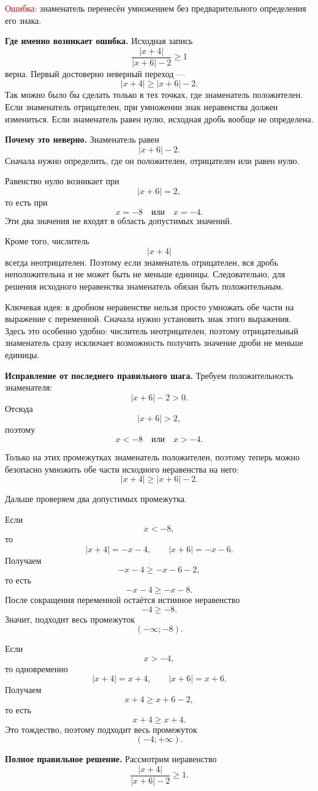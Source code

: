 \documentclass[12pt,a4paper]{article}
\newcommand{\err}{\textcolor{red}{Ошибка:}}
\newcommand{\idea}{\textcolor{blue!60!black}{Ключевая идея:}}
\begin{document}
\err{} знаменатель перенесён умножением без предварительного определения его знака.

\textbf{Где именно возникает ошибка.}
Исходная запись
\[
\frac{|x+4|}{|x+6|-2}\ge 1
\]
верна. Первый достоверно неверный переход ---
\[
|x+4|\ge |x+6|-2.
\]
Так можно было бы сделать только в тех точках, где знаменатель положителен. Если знаменатель отрицателен, при умножении знак неравенства должен измениться. Если знаменатель равен нулю, исходная дробь вообще не определена.

\textbf{Почему это неверно.}
Знаменатель равен
\[
|x+6|-2.
\]
Сначала нужно определить, где он положителен, отрицателен или равен нулю.

Равенство нулю возникает при
\[
|x+6|=2,
\]
то есть при
\[
x=-8\quad\text{или}\quad x=-4.
\]
Эти два значения не входят в область допустимых значений.

Кроме того, числитель
\[
|x+4|
\]
всегда неотрицателен. Поэтому если знаменатель отрицателен, вся дробь неположительна и не может быть не меньше единицы. Следовательно, для решения исходного неравенства знаменатель обязан быть положительным.

\idea{} в дробном неравенстве нельзя просто умножать обе части на выражение с переменной. Сначала нужно установить знак этого выражения. Здесь это особенно удобно: числитель неотрицателен, поэтому отрицательный знаменатель сразу исключает возможность получить значение дроби не меньше единицы.

\textbf{Исправление от последнего правильного шага.}
Требуем положительность знаменателя:
\[
|x+6|-2>0.
\]
Отсюда
\[
|x+6|>2,
\]
поэтому
\[
x<-8\quad\text{или}\quad x>-4.
\]

Только на этих промежутках знаменатель положителен, поэтому теперь можно безопасно умножить обе части исходного неравенства на него:
\[
|x+4|\ge |x+6|-2.
\]

Дальше проверяем два допустимых промежутка.

Если
\[
x<-8,
\]
то
\[
|x+4|=-x-4,
\qquad
|x+6|=-x-6.
\]
Получаем
\[
-x-4\ge -x-6-2,
\]
то есть
\[
-x-4\ge -x-8.
\]
После сокращения переменной остаётся истинное неравенство
\[
-4\ge -8.
\]
Значит, подходит весь промежуток
\[
(-\infty;-8).
\]

Если
\[
x>-4,
\]
то одновременно
\[
|x+4|=x+4,
\qquad
|x+6|=x+6.
\]
Получаем
\[
x+4\ge x+6-2,
\]
то есть
\[
x+4\ge x+4.
\]
Это тождество, поэтому подходит весь промежуток
\[
(-4;+\infty).
\]

\textbf{Полное правильное решение.}
Рассмотрим неравенство
\[
\frac{|x+4|}{|x+6|-2}\ge1.
\]
\end{document}
